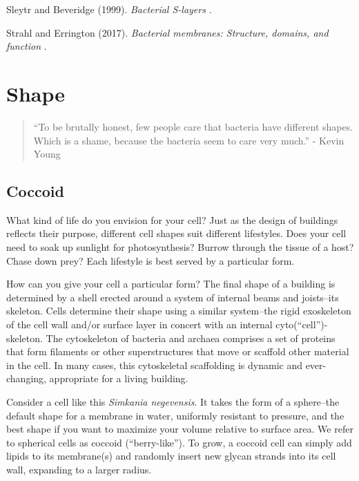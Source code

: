 \documentclass[]{tufte-book}
\begin{document}
Sleytr and Beveridge (1999). \emph{Bacterial S-layers} \citep{sleytr1999}.

Strahl and Errington (2017). \emph{Bacterial membranes: Structure, domains, and function} \citep{strahl2017}.

\hypertarget{shape}{%
\chapter{Shape}\label{shape}}

\begin{quote}
``To be brutally honest, few people care that bacteria have different shapes. Which is a shame, because the bacteria seem to care very much.''
- Kevin Young \citep{young2006}
\end{quote}

\hypertarget{coccoid}{%
\section{Coccoid}\label{coccoid}}

What kind of life do you envision for your cell? Just as the design of buildings reflects their purpose, different cell shapes suit different lifestyles. Does your cell need to soak up sunlight for photosynthesis? Burrow through the tissue of a host? Chase down prey? Each lifestyle is best served by a particular form.

How can you give your cell a particular form? The final shape of a building is determined by a shell erected around a system of internal beams and joists--its skeleton. Cells determine their shape using a similar system--the rigid exoskeleton of the cell wall and/or surface layer in concert with an internal cyto(``cell'')-skeleton. The cytoskeleton of bacteria and archaea comprises a set of proteins that form filaments or other superstructures that move or scaffold other material in the cell. In many cases, this cytoskeletal scaffolding is dynamic and ever-changing, appropriate for a living building.

Consider a cell like this \emph{Simkania negevensis}. It takes the form of a sphere--the default shape for a membrane in water, uniformly resistant to pressure, and the best shape if you want to maximize your volume relative to surface area. We refer to spherical cells as coccoid (``berry-like''). To grow, a coccoid cell can simply add lipids to its membrane(s) and randomly insert new glycan strands into its cell wall, expanding to a larger radius.
\end{document}
